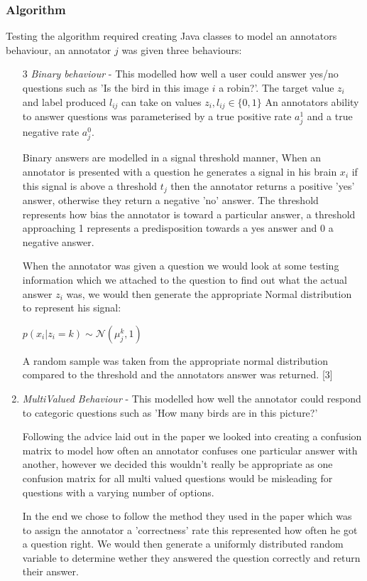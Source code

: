 \documentclass[11pt]{article}
\begin{document}
\subsubsection{Algorithm}
Testing the algorithm required creating Java classes to model an annotators behaviour, an annotator $j$ was given three behaviours:

\begin{enumerate}
\item
[3]
\emph{Binary behaviour} - This modelled how well a user could answer yes/no questions such as 'Is the bird in this image $i$ a robin?'. The target
value $z_{i}$ and label produced $l_{ij}$ can take on values $z_{i}, l_{ij} \in \{0, 1\}$ An annotators ability to answer questions was 
parameterised by a true positive rate $a_{j}^{1}$ and a true negative rate $a_{j}^{0}$.

Binary answers are modelled in a 
signal threshold manner, When an annotator is presented with a question he generates a signal in his brain $x_{i}$ if this signal is above
a threshold $t_{j}$ then the annotator returns a positive 'yes' answer, otherwise they return a negative 'no' answer. The threshold represents
how bias the annotator is toward a particular answer, a threshold approaching 1 represents a predisposition towards a yes answer and 0 a 
negative answer.

When the annotator was given a question
we would look at some testing information which we attached to the question to find out what the actual answer $z_{i}$ was, we would then generate
the appropriate Normal distribution to represent his signal:

$p(x_{i} | z_{i} = k) \sim \mathcal{N}(\mu_{j}^{k} , 1)$

A random sample was taken from the appropriate normal distribution compared to the threshold and the annotators answer was returned. 
[3]
\item
\emph{MultiValued Behaviour} - This modelled how well the annotator could respond to categoric questions such as 'How many birds are in this picture?' 

Following the advice laid out in the paper we looked into creating a confusion matrix to model how often an annotator confuses one particular answer with another, however we decided this wouldn't really be appropriate as one confusion matrix for all multi valued questions would be misleading for questions with a varying number of options. 

In the end we chose to follow the method they used in the paper which was to assign the annotator a 'correctness' rate this represented how often he got a question right. We would then generate a uniformly distributed random variable to determine wether they answered the question correctly and return their answer.


\end{enumerate}
\end{document}
